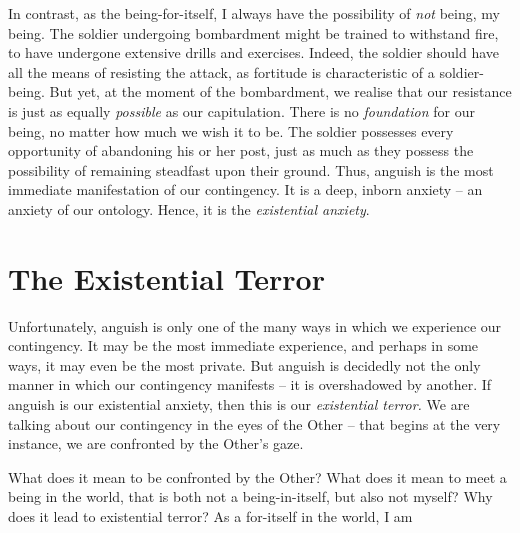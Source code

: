 In contrast, as the being-for-itself, I always have the possibility of \emph{not} being, my being. The soldier undergoing bombardment might be trained to withstand fire, to have undergone extensive drills and exercises. Indeed, the soldier should have all the means of resisting the attack, as fortitude is characteristic of a soldier-being. But yet, at the moment of the bombardment, we realise that our resistance is just as equally \emph{possible} as our capitulation. There is no \emph{foundation} for our being, no matter how much we wish it to be. The soldier possesses every opportunity of abandoning his or her post, just as much as they possess the possibility of remaining steadfast upon their ground.  Thus, anguish is the most immediate manifestation of our contingency. It is a deep, inborn anxiety -- an anxiety of our ontology. Hence, it is the \emph{existential anxiety}.

\section{The Existential Terror}

Unfortunately, anguish is only one of the many ways in which we experience our contingency. It may be the most immediate experience, and perhaps in some ways, it may even be the most private. But anguish is decidedly not the only manner in which our contingency manifests -- it is overshadowed by another. If anguish is our existential anxiety, then this is our \emph{existential terror.} We are talking about our contingency in the eyes of the Other -- that begins at the very instance, we are confronted by the Other's gaze. 

What does it mean to be confronted by the Other? What does it mean to meet a being in the world, that is both not a being-in-itself, but also not myself? Why does it lead to existential terror? 
As a for-itself in the world, I am 
